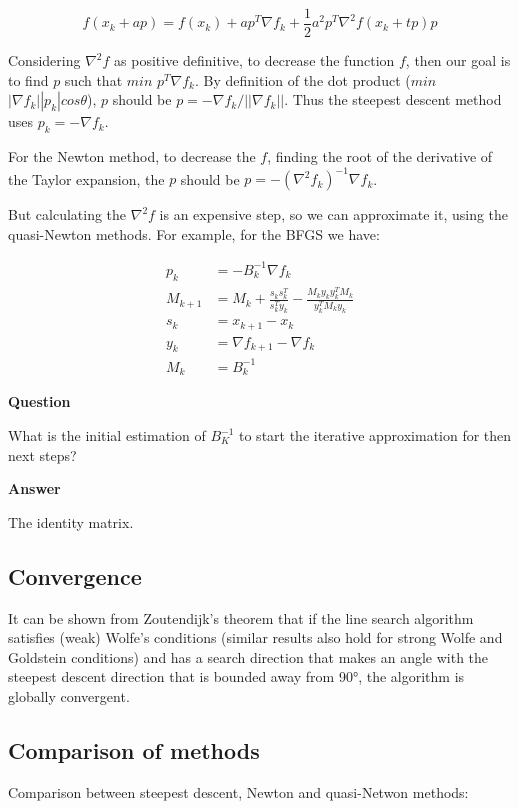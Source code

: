 \documentclass[a4paper,11pt]{article}
\numberwithin{equation}{section} %
\begin{document}
\[f(x_k + a p) = f(x_k) + a p^T \nabla f_k + \frac{1}{2} a^2 p^T \nabla^2 f(x_k + tp) p\]

Considering $\nabla^2 f$ as positive definitive, to decrease the function $f$, then our goal is to find $p$ such that
$min$ $p^T \nabla f_k$. By definition of the dot product ($min$ $|\nabla f_k| |p_k| cos \theta$), $p$ should be $p = - \nabla f_k / ||\nabla f_k||$. Thus the steepest descent method uses $p_k = - \nabla f_k$.

For the Newton method, to decrease the $f$, finding the root of the derivative of the Taylor expansion, the $p$ should be $p = - (\nabla^2 f_k) ^{-1} \nabla f_k$.

But calculating the $\nabla^2 f$ is an expensive step, so we can approximate it, using the quasi-Newton methods. For example, for the BFGS we have:

\begin{align}
    p_k &= -B_k^{-1} \nabla f_k \\
    M_{k+1} &= M_k + \frac{s_k s_k^T}{s_k^T y_k} - \frac{M_k y_k y_k^T M_k}{y_k^T M_k y_k} \\
    s_k &= x_{k+1} - x_k \\
    y_k &= \nabla f_{k+1} - \nabla f_k \\
    M_k &= B_k^{-1}
\end{align}

\textbf{Question}

What is the initial estimation of $B_K^{-1}$ to start the iterative approximation for then next steps?

\textbf{Answer}

The identity matrix.

\subsection{Convergence}

It can be shown from Zoutendijk's theorem that if the line search algorithm satisfies (weak) Wolfe's conditions (similar results also hold for strong Wolfe and Goldstein conditions) and has a search direction that makes an angle with the steepest descent direction that is bounded away from 90°, the algorithm is globally convergent. 

\subsection{Comparison of methods}

Comparison between steepest descent, Newton and quasi-Netwon methods:
\end{document}
